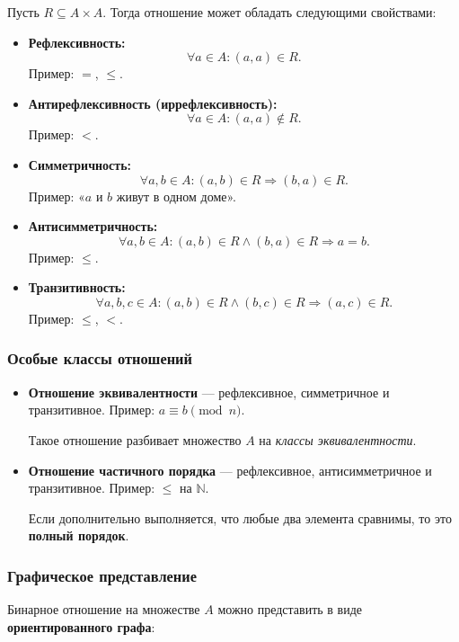 Пусть $R \subseteq A \times A$. Тогда отношение может обладать следующими свойствами:

\begin{itemize}[leftmargin=*]
  \item \textbf{Рефлексивность:}
  \[
  \forall a \in A\colon (a,a) \in R.
  \]
  Пример: $=$, $\le$.

  \item \textbf{Антирефлексивность (иррефлексивность):}
  \[
  \forall a \in A\colon (a,a) \notin R.
  \]
  Пример: $<$.

  \item \textbf{Симметричность:}
  \[
  \forall a,b \in A\colon (a,b) \in R \Rightarrow (b,a) \in R.
  \]
  Пример: «$a$ и $b$ живут в одном доме».

  \item \textbf{Антисимметричность:}
  \[
  \forall a,b \in A\colon (a,b)\in R \wedge (b,a)\in R \Rightarrow a = b.
  \]
  Пример: $\le$.

  \item \textbf{Транзитивность:}
  \[
  \forall a,b,c \in A\colon (a,b)\in R \wedge (b,c)\in R \Rightarrow (a,c)\in R.
  \]
  Пример: $\le$, $<$.
\end{itemize}

\subsubsection{Особые классы отношений}

\begin{itemize}[leftmargin=*]
  \item \textbf{Отношение эквивалентности} — рефлексивное, симметричное и транзитивное.  
  Пример: $a \equiv b \pmod{n}$.

  Такое отношение разбивает множество $A$ на \textit{классы эквивалентности}.

  \item \textbf{Отношение частичного порядка} — рефлексивное, антисимметричное и транзитивное.  
  Пример: $\le$ на $\mathbb{N}$.

  Если дополнительно выполняется, что любые два элемента сравнимы, то это \textbf{полный порядок}.
\end{itemize}

\subsubsection{Графическое представление}

Бинарное отношение на множестве $A$ можно представить в виде \textbf{ориентированного графа}:

